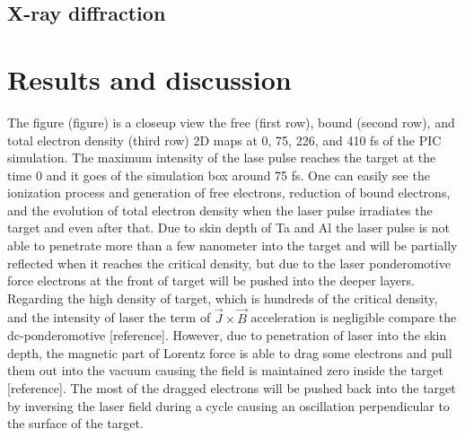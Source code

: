 \documentclass[preprint, 12pt]{elsarticle}
\begin{document}
\subsection{X-ray diffraction}

\section{Results and discussion}
The figure (figure) is a closeup view the free (first row), bound (second row),
and total electron density (third row) 2D maps at 0, 75, 226, and 410 fs of the
PIC simulation. The maximum intensity of the lase pulse reaches the target at
the time 0 and it goes of the simulation box around 75 fs. One can easily see
the ionization process and generation of free electrons, reduction of bound
electrons, and the evolution of total electron density when the laser pulse
irradiates the target and even after that. Due to skin depth of Ta and Al the
laser pulse is not able to penetrate more than a few nanometer into the target
and will be partially reflected when it reaches the critical density, but due to
the laser ponderomotive force electrons at the front of target will be pushed
into the deeper layers. Regarding the high density of target, which is hundreds
of the critical density, and the intensity of laser the term of $\vec{J} \times
\vec{B}$ acceleration is negligible compare the dc-ponderomotive [reference].
However, due to penetration of laser into the skin depth, the magnetic part of
Lorentz force is able to drag some electrons and pull them out into the vacuum
causing the field is maintained zero inside the target [reference]. The most of
the dragged electrons will be pushed back into the target by inversing the laser
field during a cycle causing an oscillation perpendicular to the surface of the
target.
\end{document}
